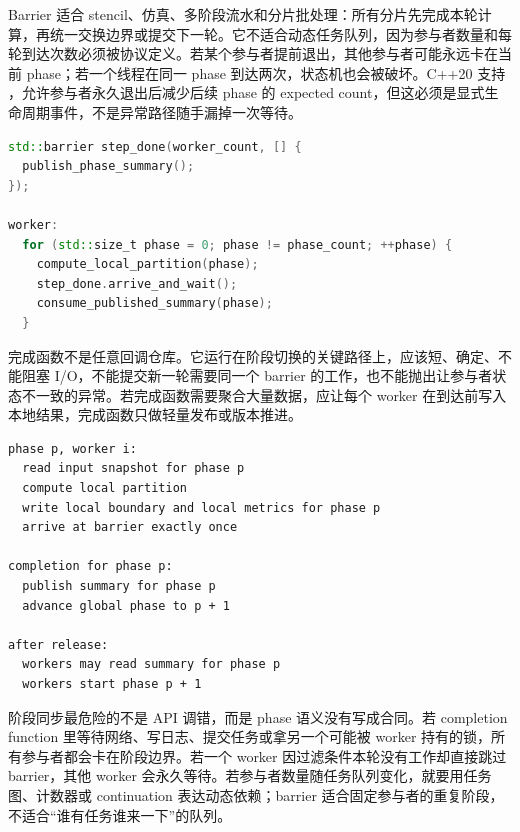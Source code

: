 Barrier 适合 stencil、仿真、多阶段流水和分片批处理：所有分片先完成本轮计算，再统一交换边界或提交下一轮。它不适合动态任务队列，因为参与者数量和每轮到达次数必须被协议定义。若某个参与者提前退出，其他参与者可能永远卡在当前 phase；若一个线程在同一 phase 到达两次，状态机也会被破坏。C++20  支持 ，允许参与者永久退出后减少后续 phase 的 expected count，但这必须是显式生命周期事件，不是异常路径随手漏掉一次等待。

\begin{lstlisting}[language=C++,caption={barrier 表达多轮分片阶段}]
std::barrier step_done(worker_count, [] {
  publish_phase_summary();
});

worker:
  for (std::size_t phase = 0; phase != phase_count; ++phase) {
    compute_local_partition(phase);
    step_done.arrive_and_wait();
    consume_published_summary(phase);
  }
\end{lstlisting}

完成函数不是任意回调仓库。它运行在阶段切换的关键路径上，应该短、确定、不能阻塞 I/O，不能提交新一轮需要同一个 barrier 的工作，也不能抛出让参与者状态不一致的异常。若完成函数需要聚合大量数据，应让每个 worker 在到达前写入本地结果，完成函数只做轻量发布或版本推进。

\begin{lstlisting}[numbers=none,caption={barrier 阶段同步的可审查账本}]
phase p, worker i:
  read input snapshot for phase p
  compute local partition
  write local boundary and local metrics for phase p
  arrive at barrier exactly once

completion for phase p:
  publish summary for phase p
  advance global phase to p + 1

after release:
  workers may read summary for phase p
  workers start phase p + 1
\end{lstlisting}

阶段同步最危险的不是 API 调错，而是 phase 语义没有写成合同。若 completion function 里等待网络、写日志、提交任务或拿另一个可能被 worker 持有的锁，所有参与者都会卡在阶段边界。若一个 worker 因过滤条件本轮没有工作却直接跳过 barrier，其他 worker 会永久等待。若参与者数量随任务队列变化，就要用任务图、计数器或 continuation 表达动态依赖；barrier 适合固定参与者的重复阶段，不适合“谁有任务谁来一下”的队列。

